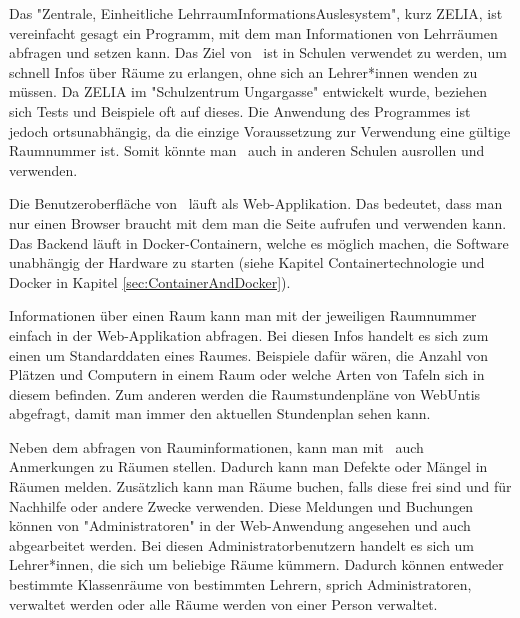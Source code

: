 

Das "Zentrale, Einheitliche LehrraumInformationsAuslesystem", kurz ZELIA, ist vereinfacht gesagt ein Programm, mit dem man Informationen von Lehrräumen abfragen und setzen kann. Das Ziel von \ZELIA\ ist in Schulen verwendet zu werden, um schnell Infos über Räume zu erlangen, ohne sich an Lehrer*innen wenden zu müssen. Da \mbox{ZELIA} im "Schulzentrum Ungargasse" entwickelt wurde, beziehen sich Tests und Beispiele oft auf dieses. Die Anwendung des Programmes ist jedoch ortsunabhängig, da die einzige Voraussetzung zur Verwendung eine gültige Raumnummer ist. Somit könnte man \ZELIA\ auch in anderen Schulen ausrollen und verwenden. 

Die Benutzeroberfläche von \ZELIA\ läuft als Web-Applikation. Das bedeutet, dass man nur einen Browser braucht mit dem man die Seite aufrufen und verwenden kann. Das Backend läuft in Docker-Containern, welche es möglich machen, die Software unabhängig der Hardware zu starten (siehe Kapitel Containertechnologie und Docker in Kapitel \ref{sec:ContainerAndDocker}).

Informationen über einen Raum kann man mit der jeweiligen Raumnummer einfach in der Web-Applikation abfragen. Bei diesen Infos handelt es sich zum einen um Standarddaten eines Raumes. Beispiele dafür wären, die Anzahl von Plätzen und Computern in einem Raum oder welche Arten von Tafeln sich in diesem befinden. Zum anderen werden die Raumstundenpläne von WebUntis abgefragt, damit man immer den aktuellen Stundenplan sehen kann.

Neben dem abfragen von Rauminformationen, kann man mit \ZELIA\ auch Anmerkungen zu Räumen stellen. Dadurch kann man Defekte oder Mängel in Räumen melden. Zusätzlich kann man Räume buchen, falls diese frei sind und für Nachhilfe oder andere Zwecke verwenden. Diese Meldungen und Buchungen können von "Administratoren" in der Web-Anwendung angesehen und auch abgearbeitet werden. Bei diesen Administratorbenutzern handelt es sich um Lehrer*innen, die sich um beliebige Räume kümmern. Dadurch können entweder bestimmte Klassenräume von bestimmten Lehrern, sprich Administratoren, verwaltet werden oder alle Räume werden von einer Person verwaltet.

